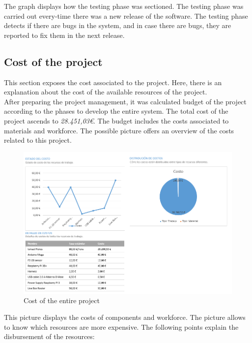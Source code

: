 The graph displays how the testing phase was sectioned. The testing phase was carried out every-time there was a new release of the software. The testing phase detects if there are bugs in the system, and in case there are bugs, they are reported to fix them in the next release.

\subsection{Cost of the project}

This section exposes the cost associated to the project. Here, there is an explanation about the cost of the available resources of the project.\\

After preparing the project management, it was calculated budget of the project according to the phases to develop the entire system. The total cost of the project ascends to \textit{28.451,03\euro}. The budget includes the costs associated to materials and workforce. The possible picture offers an overview of the costs related to this project.\\

\begin{figure}[H]
\begin{centering}
\includegraphics[scale=0.65]{IMGS/numbers_project.PNG}
\caption{Cost of the entire project \label{Cost of the entire project}}
\end{centering}
\end{figure}

\newpage

This picture displays the costs of components and workforce. The picture allows to know which resources are more expensive. The following points explain the disbursement of the resources:

